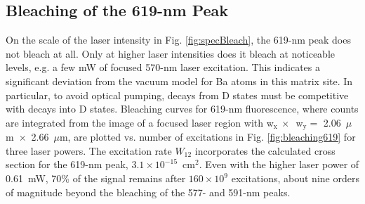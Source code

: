 
\subsection{Bleaching of the 619-nm Peak}


On the scale of the laser intensity in Fig. \ref{fig:specBleach}, the 619-nm peak does not bleach at all.  Only at higher laser intensities does it bleach at noticeable levels, e.g. a few mW of focused 570-nm laser excitation.  This indicates a significant deviation from the vacuum model for Ba atoms in this matrix site.  In particular, to avoid optical pumping, decays from D states must be competitive with decays into D states.  Bleaching curves for 619-nm fluorescence, where counts are integrated from the image of a focused laser region with w$_{\text{x}}~\times$~w$_{\text{y}} =$ 2.06~$\mu$m~$\times$~2.66~$\mu$m, are plotted vs. number of excitations in Fig. \ref{fig:bleaching619} for three laser powers.  The excitation rate $W_{12}$ incorporates the calculated cross section for the 619-nm peak, $3.1 \times 10^{-15}$~cm$^{2}$.  Even with the higher laser power of 0.61~mW, 70\% of the signal remains after $160 \times 10^{9}$ excitations, about nine orders of magnitude beyond the bleaching of the 577- and 591-nm peaks.


